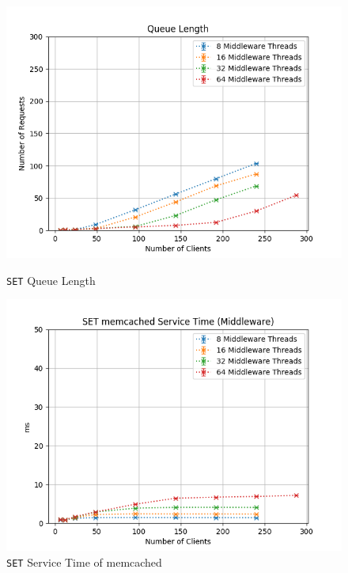 \documentclass[11pt,a4paper]{article}
\begin{document}
\begin{figure}[H]
	\centering
	\captionsetup{width=0.4\textwidth}
    \begin{minipage}{0.5\textwidth}
        \includegraphics[width=\textwidth]{../illustrations/plots/2_2_two_middlewares/1-0/middleware_queue_length.png}
        \caption{\texttt{SET} Queue Length}
        \label{fig:two_middlewares_set_ql}
    \end{minipage}\hfill
    \begin{minipage}{0.5\textwidth}
        \centering
        \includegraphics[width=\textwidth]{../illustrations/plots/2_2_two_middlewares/1-0/middleware_set_service_time_ms.png}
        \caption{\texttt{SET} Service Time of memcached}
        \label{fig:two_middlewares_set_st_mw}
    \end{minipage}
\end{figure}
\end{document}
